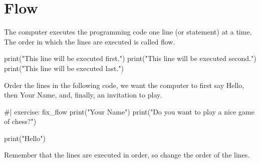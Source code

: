 \documentclass[
  letterpaper,
  DIV=11,
  numbers=noendperiod]{scrreprt}
\newenvironment{Shaded}{\begin{snugshade}}{\end{snugshade}}
\newcommand{\NormalTok}[1]{\textcolor[rgb]{0.00,0.23,0.31}{#1}}
\theoremstyle{remark}
\begin{document}
\section{Flow}\label{flow}

The computer executes the programming code one line (or statement) at a
time. The order in which the lines are executed is called flow.

\begin{Shaded}
\begin{Highlighting}[]
\NormalTok{print("This line will be executed first.")}
\NormalTok{print("This line will be executed second.")}
\NormalTok{print("This line will be executed last.")}
\end{Highlighting}
\end{Shaded}

Order the lines in the following code, we want the computer to first say
Hello, then Your Name, and, finally, an invitation to play.

\begin{Shaded}
\begin{Highlighting}[]
\NormalTok{\#| exercise: fix\_flow}
\NormalTok{print("Your Name")}
\NormalTok{print("Do you want to play a nice game of chess?")}

\NormalTok{print("Hello")}
\end{Highlighting}
\end{Shaded}

\begin{tcolorbox}[enhanced jigsaw, opacityback=0, colframe=quarto-callout-note-color-frame, breakable, colback=white, colbacktitle=quarto-callout-note-color!10!white, titlerule=0mm, left=2mm, toprule=.15mm, coltitle=black, opacitybacktitle=0.6, bottomrule=.15mm, arc=.35mm, leftrule=.75mm, bottomtitle=1mm, toptitle=1mm, rightrule=.15mm, title=\textcolor{quarto-callout-note-color}{\faInfo}\hspace{0.5em}{Note}]

Remember that the lines are executed in order, so change the order of
the lines.

\end{tcolorbox}
\end{document}
